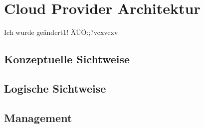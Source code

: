 \section{Cloud Provider Architektur}
Ich wurde geändert1! ÄÜÖ:;?vcxvcxv
\subsection{Konzeptuelle Sichtweise}
\subsection{Logische Sichtweise}
\subsection{Management}